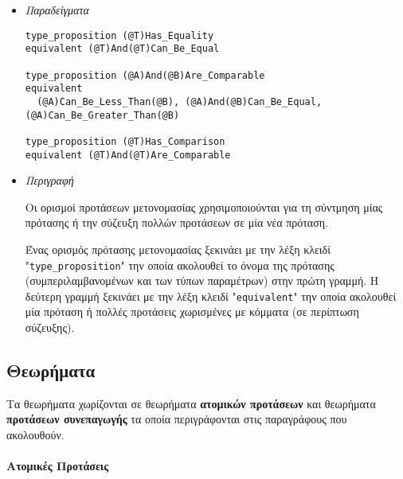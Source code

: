 \documentclass[diploma]{softlab-thesis}
\begin{document}
\begin{itemize}
\item \textit{Παραδείγματα}
\begin{verbatim}
type_proposition (@T)Has_Equality
equivalent (@T)And(@T)Can_Be_Equal

type_proposition (@A)And(@B)Are_Comparable
equivalent
  (@A)Can_Be_Less_Than(@B), (@A)And(@B)Can_Be_Equal, (@A)Can_Be_Greater_Than(@B)

type_proposition (@T)Has_Comparison
equivalent (@T)And(@T)Are_Comparable
\end{verbatim}

\item \textit{Περιγραφή}

Οι ορισμοί προτάσεων μετονομασίας χρησιμοποιούνται για τη σύντμηση μίας
πρότασης ή την σύζευξη πολλών προτάσεων σε μία νέα πρόταση.

Ένας ορισμός πρότασης μετονομασίας ξεκινάει με την λέξη κλειδί
"\verb|type_proposition|" την οποία ακολουθεί το όνομα της πρότασης
(συμπεριλαμβανομένων και των τύπων παραμέτρων) στην πρώτη γραμμή.
Η δεύτερη γραμμή ξεκινάει με την λέξη κλειδί "\verb|equivalent|"
την οποία ακολουθεί μία πρόταση ή πολλές προτάσεις χωρισμένες με κόμματα
(σε περίπτωση σύζευξης).

\end{itemize}

\newpage
\subsection{Θεωρήματα}

Τα θεωρήματα χωρίζονται σε θεωρήματα \textbf{ατομικών προτάσεων} και
θεωρήματα \textbf{προτάσεων συνεπαγωγής} τα οποία περιγράφονται στις
παραγράφους που ακολουθούν.

\paragraph{Ατομικές Προτάσεις}
\end{document}
